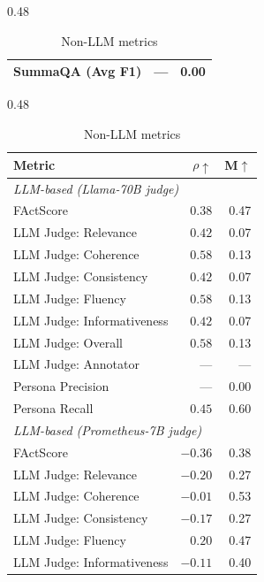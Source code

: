 \begin{table}[htbp]
\begin{subtable}[t]{0.48\textwidth}
\begin{tabular}{lrr}
\rowcolor{matchFalse} SummaQA (Avg F1)                      &      --- &  0.00 \\
\bottomrule
\end{tabular}
\caption{Non-LLM metrics}
\end{subtable}
\hfill
\begin{subtable}[t]{0.48\textwidth}
\centering
\begin{tabular}{lrr}
\toprule
Metric & $\rho\uparrow$ & M$\uparrow$ \\
\midrule
\multicolumn{3}{l}{\textit{LLM-based (Llama-70B judge)}} \\
\midrule
\rowcolor{matchFalse} FActScore                             &   $0.38$ &  0.47 \\
\rowcolor{matchTrue} LLM Judge: Relevance                  &   $0.42$ &  0.07 \\
\rowcolor{matchTrue} LLM Judge: Coherence                  &   $0.58$ &  0.13 \\
\rowcolor{matchTrue} LLM Judge: Consistency                &   $0.42$ &  0.07 \\
\rowcolor{matchTrue} LLM Judge: Fluency                    &   $0.58$ &  0.13 \\
\rowcolor{matchTrue} LLM Judge: Informativeness            &   $0.42$ &  0.07 \\
\rowcolor{matchTrue} LLM Judge: Overall                    &   $0.58$ &  0.13 \\
\rowcolor{matchFalse} LLM Judge: Annotator        &      --- &  --- \\
\rowcolor{matchFalse} Persona Precision                     &      --- &  0.00 \\
\rowcolor{matchTrue} Persona Recall                        &   $0.45$ &  0.60 \\
\midrule
\multicolumn{3}{l}{\textit{LLM-based (Prometheus-7B judge)}} \\
\midrule
\rowcolor{matchFalse} FActScore                             &  $-0.36$ &  0.38 \\
\rowcolor{matchFalse} LLM Judge: Relevance                  &  $-0.20$ &  0.27 \\
\rowcolor{matchFalse} LLM Judge: Coherence                  &  $-0.01$ &  0.53 \\
\rowcolor{matchFalse} LLM Judge: Consistency                &  $-0.17$ &  0.27 \\
\rowcolor{matchFalse} LLM Judge: Fluency                    &   $0.20$ &  0.47 \\
\rowcolor{matchFalse} LLM Judge: Informativeness            &  $-0.11$ &  0.40 \\

\end{tabular}
\end{subtable}
\end{table}
